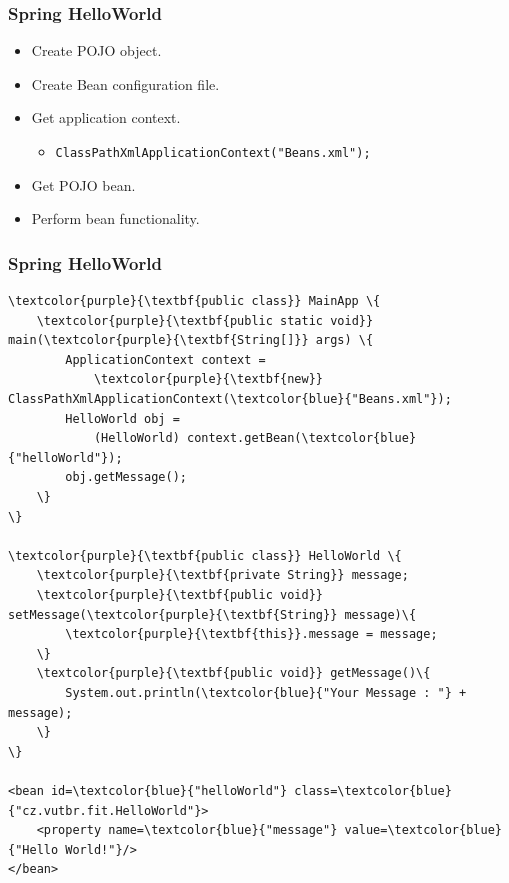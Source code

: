 \documentclass[10pt,xcolor=pdflatex, table]{beamer}
\begin{document}
\begin{frame}\frametitle{Spring HelloWorld}
	\begin{itemize}
		\item Create POJO object.
		\item Create Bean configuration file.
		\item Get application context.\\
          \begin{itemize}
        	\item \texttt{ClassPathXmlApplicationContext("Beans.xml");}
          \end{itemize}
		\item Get POJO bean.
		\item Perform bean functionality.
	\end{itemize}
\end{frame}


\begin{frame}[fragile]\frametitle{Spring HelloWorld}
\begin{Verbatim}[fontsize=\footnotesize, commandchars=\\\{\}]
\textcolor{purple}{\textbf{public class}} MainApp \{
    \textcolor{purple}{\textbf{public static void}} main(\textcolor{purple}{\textbf{String[]}} args) \{
        ApplicationContext context =
            \textcolor{purple}{\textbf{new}} ClassPathXmlApplicationContext(\textcolor{blue}{"Beans.xml"});
        HelloWorld obj =
            (HelloWorld) context.getBean(\textcolor{blue}{"helloWorld"});
        obj.getMessage();
    \}
\}

\textcolor{purple}{\textbf{public class}} HelloWorld \{
    \textcolor{purple}{\textbf{private String}} message;
    \textcolor{purple}{\textbf{public void}} setMessage(\textcolor{purple}{\textbf{String}} message)\{
        \textcolor{purple}{\textbf{this}}.message = message;
    \}
    \textcolor{purple}{\textbf{public void}} getMessage()\{
        System.out.println(\textcolor{blue}{"Your Message : "} + message);
    \}
\}

<bean id=\textcolor{blue}{"helloWorld"} class=\textcolor{blue}{"cz.vutbr.fit.HelloWorld"}>
    <property name=\textcolor{blue}{"message"} value=\textcolor{blue}{"Hello World!"}/>
</bean>
\end{Verbatim}
\end{frame}
\end{document}
